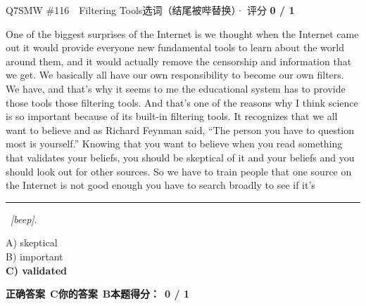 \begin{qblock}{Q7\quad SMW \#116\ \ Filtering Tools}{选词（结尾被哔替换）· 评分 \textcolor{cAccent}{\bfseries 0 / 1}}
\begin{promptbox}
One of the biggest surprises of the Internet is we thought when the Internet came out it would provide everyone new fundamental tools to learn about the world around them, and it would actually remove the censorship and information that we get. We basically all have our own responsibility to become our own filters. We have, and that's why it seems to me the educational system has to provide those tools those filtering tools. And that's one of the reasons why I think science is so important because of its built-in filtering tools. It recognizes that we all want to believe and as Richard Feynman said, ``The person you have to question most is yourself.'' Knowing that you want to believe when you read something that validates your beliefs, you should be skeptical of it and your beliefs and you should look out for other sources. So we have to train people that one source on the Internet is not good enough you have to search broadly to see if it's \rule[0.3ex]{1.2cm}{0.4pt}\ \textit{[beep]}.
\end{promptbox}
{\small
A) skeptical\\
B) important\\
{\color{cFix}\textbf{C) validated}}}
\par\smallskip
\textbf{正确答案}\ \textcolor{cFix}{\bfseries C}\qquad\textbf{你的答案}\ {\color{cWrong}\bfseries B}\qquad\textbf{本题得分：}\ {\color{cAccent}\bfseries 0 / 1}
\end{qblock}


